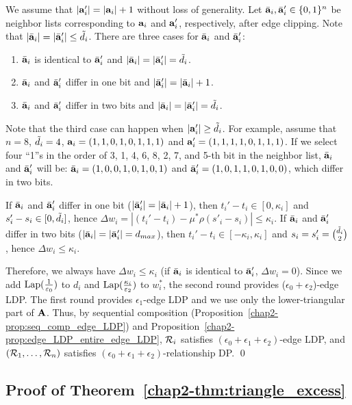 {We assume that $|\mathbf{a}'_i| = |\mathbf{a}_i| + 1$ without loss of generality.
Let $\bar{\mathbf{a}}_i, \bar{\mathbf{a}}'_i \in \{0,1\}^n$ be neighbor lists corresponding to $\mathbf{a}_i$ and $\mathbf{a}'_i$, respectively, after edge clipping.
Note that $|\bar{\mathbf{a}}_i| = |\bar{\mathbf{a}}'_i| \leq \tilde{d}_i$.
There are three cases for $\bar{\mathbf{a}}_i$ and $\bar{\mathbf{a}}'_i$:
\begin{enumerate}
    \item $\bar{\mathbf{a}}_i$ is identical to $\bar{\mathbf{a}}'_i$ and $|\bar{\mathbf{a}}_i| = |\bar{\mathbf{a}}'_i| = \tilde{d}_i$.
    \item $\bar{\mathbf{a}}_i$ and $\bar{\mathbf{a}}'_i$ differ in one bit and $|\bar{\mathbf{a}}'_i| = |\bar{\mathbf{a}}_i| + 1$.
    \item $\bar{\mathbf{a}}_i$ and $\bar{\mathbf{a}}'_i$ differ in two bits and $|\bar{\mathbf{a}}_i| = |\bar{\mathbf{a}}'_i| = \tilde{d}_i$.
\end{enumerate}
Note that the third case can happen when $|\mathbf{a}'_i| \geq \tilde{d}_i$.
For example, assume that $n=8$, $\tilde{d}_i=4$, $\mathbf{a}_i=(1,1,0,1,0,1,1,1)$ and $\mathbf{a}'_i=(1,1,1,1,0,1,1,1)$.
If we select four ``1''s in the order of 3, 1, 4, 6, 8, 2, 7, and 5-th bit in the neighbor list,
$\bar{\mathbf{a}}_i$ and $\bar{\mathbf{a}}'_i$ will be:
$\bar{\mathbf{a}}_i=(1,0,0,1,0,1,0,1)$ and $\bar{\mathbf{a}}'_i=(1,0,1,1,0,1,0,0)$,
which differ in two bits.

If $\bar{\mathbf{a}}_i$ and $\bar{\mathbf{a}}'_i$ differ in one bit ($|\bar{\mathbf{a}}'_i| = |\bar{\mathbf{a}}_i| + 1$), then ${t_i}' - t_i \in [0,\kappa_i]$ and $s'_i - s_i \in [0,\tilde{d}_i]$, hence $\Delta w_i = |({t_i}' - t_i) - \mu^*\rho(s'_i - s_i)| \leq \kappa_i$.
If $\bar{\mathbf{a}}_i$ and $\bar{\mathbf{a}}'_i$ differ in two bits ($|\bar{\mathbf{a}}_i| = |\bar{\mathbf{a}}'_i| = d_{max}$), then ${t_i}' - t_i \in [-\kappa_i,\kappa_i]$ and $s_i = s'_i = \binom{\tilde{d}_i}{2}$, hence $\Delta w_i \leq \kappa_i$.

Therefore, we always have $\Delta w_i \leq \kappa_i$
(if $\bar{\mathbf{a}}_i$ is identical to $\bar{\mathbf{a}}'_i$, $\Delta w_i =0$).
Since we add $\textrm{Lap}(\frac{1}{\varepsilon_0})$
to $d_i$ and
$\textrm{Lap}(\frac{\kappa_i}{\varepsilon_2})$
to $w_i^*$, the second round provides ($\epsilon_0+\epsilon_2$)-edge LDP.
The first round provides $\epsilon_1$-edge LDP and we use only the lower-triangular part of $\mathbf{A}$.
Thus, by sequential composition (Proposition~\ref{chap2-prop:seq_comp_edge_LDP}) 
and Proposition~\ref{chap2-prop:edge_LDP_entire_edge_LDP},
$\mathcal{R}_i$ satisfies $(\epsilon_0 + \epsilon_1 + \epsilon_2)$-edge LDP, and $(\mathcal{R}_1, \ldots, \mathcal{R}_n)$ satisfies $(\epsilon_0 + \epsilon_1 + \epsilon_2)$-relationship DP.
\qed

\subsection{Proof of Theorem~\ref{chap2-thm:triangle_excess}}

}
